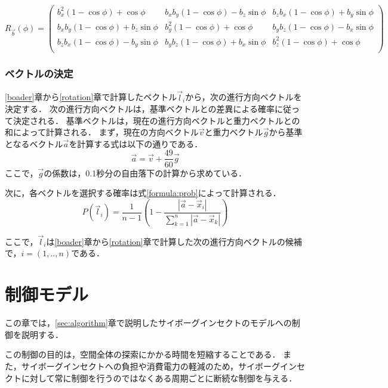 \documentclass[a4paper,11pt]{jarticle}
\begin{document}
	\begin{equation}
	\label{formula:rotation}
	R_{\vec{b}}(\phi)=\left( \begin{array}{ccc}
	b_x^2(1-\cos\phi)+\cos\phi & b_x b_y (1-\cos\phi) - b_z\sin\phi & b_z b_x (1-\cos\phi) + b_y\sin\phi \\
	b_x b_y (1-\cos\phi)+b_z \sin\phi & b_y^2 (1-\cos\phi) + \cos\phi & b_y b_z (1-\cos\phi) - b_x\sin\phi \\
	b_z b_x (1-\cos\phi)- b_y\sin\phi & b_y b_z (1-\cos\phi) + b_x \sin\phi & b_z^2 (1-\cos\phi) + \cos\phi \\
	\end{array} \right)
	\end{equation}
	
	\subsubsection{ベクトルの決定}
	\ref{boader}章から\ref{rotation}章で計算したベクトル$\vec{l}_i$から，次の進行方向ベクトルを決定する．
	次の進行方向ベクトルは，基準ベクトルとの差異による確率に従って決定される．
	基準ベクトルは，現在の進行方向ベクトルと重力ベクトルとの和によって計算される．
	まず，現在の方向ベクトル$ \vec{v} $と重力ベクトル$ \vec{g} $から基準となるベクトル$ \vec{a} $を計算する式は以下の通りである．
	\begin{equation}
	\vec{a} = \vec{v} +\frac{49}{60} \vec{g} 
	\end{equation}
	ここで，$ \vec{g} $の係数は，0.1秒分の自由落下の計算から求めている．
	
	次に，各ベクトルを選択する確率は式\ref{formula:prob}によって計算される．
	\begin{equation}
	\label{formula:prob}
	P(\vec{l}_i) = \frac{1}{n-1}(1 - \frac{|\vec{a} - \vec{x}_i |}{\sum_{k=1}^{n}|\vec{a} - \vec{x}_k|})
	\end{equation}
	
	ここで，$ \vec{l}_i $は\ref{boader}章から\ref{rotation}章で計算した次の進行方向ベクトルの候補で，$ i = (1,..,n) $である．
	
	\section{制御モデル}
	\label{sec:control}
	この章では，\ref{sec:algorithm}章で説明したサイボーグインセクトのモデルへの制御を説明する．
	
	この制御の目的は，空間全体の探索にかかる時間を短縮することである．
	また，サイボーグインセクトへの負担や消費電力の軽減のため，サイボーグインセクトに対して常に制御を行うのではなくある周期ごとに断続な制御を与える．
	
\end{document}
